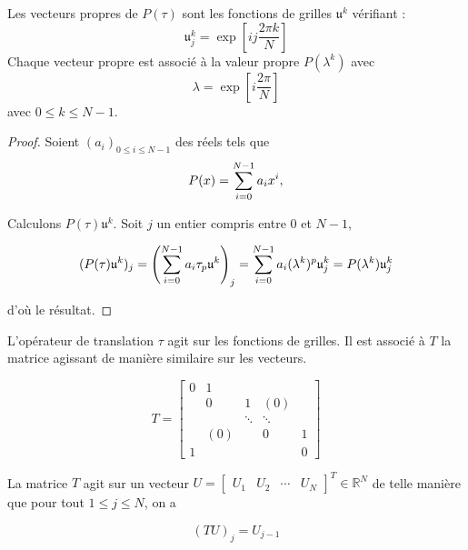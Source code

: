\begin{proposition}
Les vecteurs propres de $P(\tau)$ sont les fonctions de grilles $\mathfrak{u}^k$ vérifiant :
\begin{equation}
\mathfrak{u}_j^k = \exp \left[ i j \dfrac{2 \pi k}{N} \right]
\end{equation}
Chaque vecteur propre est associé à la valeur propre $P(\lambda^k)$ avec 
\begin{equation}
\lambda = \exp \left[ i \dfrac{2 \pi}{N} \right]
\end{equation}
avec $0 \leq k \leq N-1$.
\label{prop:eigen_tau}
\end{proposition}

\begin{proof}
Soient $(a_i)_{0 \leq i \leq N-1}$ des réels tels que 
\begin{equation}
P(x) = \displaystyle\sum\limits_{i=0}^{N-1} a_i x^i,
\end{equation}

Calculons $P(\tau) \mathfrak{u}^k$. Soit $j$ un entier compris entre $0$ et $N-1$, 

\begin{equation}
(P(\tau) \mathfrak{u}^k)_j = \left( \displaystyle\sum\limits_{i=0}^{N-1} a_i \tau_ p \mathfrak{u}^k \right)_j = \displaystyle\sum\limits_{i=0}^{N-1} a_i (\lambda^k)^p \mathfrak{u}^k_j = P(\lambda^k) \mathfrak{u}^k_j
\end{equation}

d'où le résultat.
\end{proof}
L'opérateur de translation $\tau$ agit sur les fonctions de grilles. Il est associé à $T$ la matrice agissant de manière similaire sur les vecteurs.

\begin{equation}
T = \begin{bmatrix}
0 & 1 &   &   &   \\ 
  & 0 & 1 & (0) &   \\ 
  &   & \ddots & \ddots &   \\ 
  & (0) &   & 0 & 1 \\ 
1 &   &   &   & 0
\end{bmatrix} 
\end{equation}

La matrice $T$ agit sur un vecteur $U = \begin{bmatrix}
U_1 & U_2 & \cdots & U_{N} 
\end{bmatrix}^T \in \mathbb{R}^N $ de telle manière que pour tout $1 \leq j \leq N$, on a 

\begin{equation}
(TU)_j = U_{j-1}
\end{equation}

